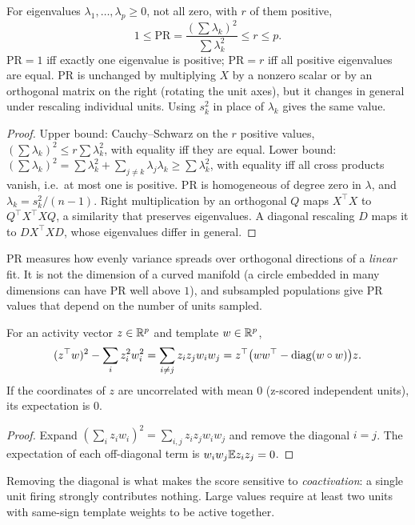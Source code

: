 \begin{theorem}\label{ars:pca-002}
For eigenvalues $\lambda_1,\dots,\lambda_p\ge0$, not all zero, with $r$ of them positive,
\[1\le\mathrm{PR}=\frac{(\sum\lambda_k)^2}{\sum\lambda_k^2}\le r\le p.\]
$\mathrm{PR}=1$ iff exactly one eigenvalue is positive; $\mathrm{PR}=r$ iff all positive eigenvalues are equal. $\mathrm{PR}$ is unchanged by multiplying $X$ by a nonzero scalar or by an orthogonal matrix on the right (rotating the unit axes), but it changes in general under rescaling individual units. Using $s_k^2$ in place of $\lambda_k$ gives the same value.
\end{theorem}
\begin{proof}
Upper bound: Cauchy--Schwarz on the $r$ positive values, $(\sum\lambda_k)^2\le r\sum\lambda_k^2$, with equality iff they are equal. Lower bound: $(\sum\lambda_k)^2=\sum\lambda_k^2+\sum_{j\ne k}\lambda_j\lambda_k\ge\sum\lambda_k^2$, with equality iff all cross products vanish, i.e.\ at most one is positive. PR is homogeneous of degree zero in $\lambda$, and $\lambda_k=s_k^2/(n-1)$. Right multiplication by an orthogonal $Q$ maps $X^\top X$ to $Q^\top X^\top XQ$, a similarity that preserves eigenvalues. A diagonal rescaling $D$ maps it to $DX^\top XD$, whose eigenvalues differ in general.
\end{proof}
\begin{remark}
PR measures how evenly variance spreads over orthogonal directions of a \emph{linear} fit. It is not the dimension of a curved manifold (a circle embedded in many dimensions can have PR well above $1$), and subsampled populations give PR values that depend on the number of units sampled.
\end{remark}

\begin{theorem}\label{ars:pca-003}
For an activity vector $z\in\mathbb R^p$ and template $w\in\mathbb R^p$,
\[(z^\top w)^2-\sum_iz_i^2w_i^2=\sum_{i\ne j}z_iz_jw_iw_j=z^\top\bigl(ww^\top-\operatorname{diag}(w\circ w)\bigr)z.\]
If the coordinates of $z$ are uncorrelated with mean $0$ (z-scored independent units), its expectation is $0$.
\end{theorem}
\begin{proof}
Expand $(\sum_iz_iw_i)^2=\sum_{i,j}z_iz_jw_iw_j$ and remove the diagonal $i=j$. The expectation of each off-diagonal term is $w_iw_j\mathbb E z_iz_j=0$.
\end{proof}
Removing the diagonal is what makes the score sensitive to \emph{coactivation}: a single unit firing strongly contributes nothing. Large values require at least two units with same-sign template weights to be active together.

